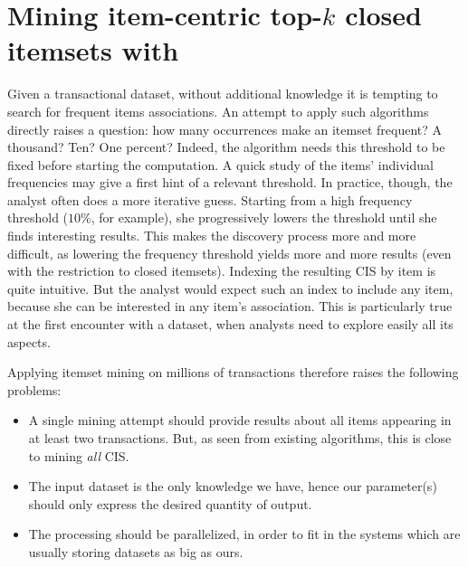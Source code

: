 \chapter{Mining item-centric top-$k$ closed itemsets with \toppi}
\label{chap:toppi}


\minitoc


Given a transactional dataset,
without additional knowledge
it is tempting to search for frequent items associations.
An attempt to apply such algorithms directly raises a question:
how many occurrences make an itemset frequent? A thousand? Ten? One percent?
Indeed, the algorithm needs this threshold to be fixed before starting the computation.
A quick study of the items' individual frequencies may give a first hint of a relevant threshold.
In practice, though, the analyst often does a more iterative guess.
Starting from a high frequency threshold ($10\%$, for example),
she progressively lowers the threshold until she finds interesting results.
This makes the discovery process more and more difficult,
as lowering the frequency threshold yields more and more results
(even with the restriction to closed itemsets).
Indexing the resulting CIS by item is quite intuitive.
But the analyst would expect such an index to include any item,
because she can be interested in any item's association.
This is particularly true at the first encounter with a dataset,
when analysts need to explore easily all its aspects.

Applying itemset mining on millions of transactions therefore raises the following problems:

\begin{itemize}
	\item A single mining attempt should provide results about all items appearing in at least two transactions.
	But, as seen from existing algorithms, this is close to mining {\em all} CIS.

	\item The input dataset is the only knowledge we have,
		hence our parameter(s) should only express the desired quantity of output.

	\item The processing should be parallelized,
		in order to fit in the systems which are usually storing datasets as big as ours.
\end{itemize}


